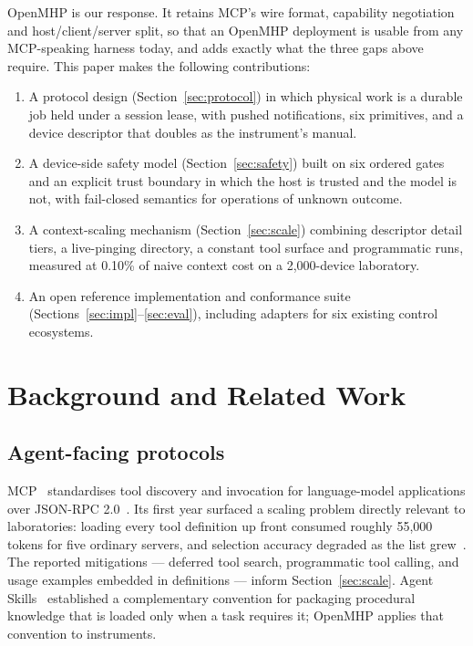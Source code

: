 \documentclass[11pt]{article}
\begin{document}
OpenMHP is our response. It retains MCP's wire format, capability negotiation and
host/client/server split, so that an OpenMHP deployment is usable from any MCP-speaking
harness today, and adds exactly what the three gaps above require. This paper makes the
following contributions:

\begin{enumerate}
  \item A protocol design (Section~\ref{sec:protocol}) in which physical work is a durable
    job held under a session lease, with pushed notifications, six primitives, and a
    device descriptor that doubles as the instrument's manual.
  \item A device-side safety model (Section~\ref{sec:safety}) built on six ordered gates and
    an explicit trust boundary in which the host is trusted and the model is not, with
    fail-closed semantics for operations of unknown outcome.
  \item A context-scaling mechanism (Section~\ref{sec:scale}) combining descriptor detail
    tiers, a live-pinging directory, a constant tool surface and programmatic runs, measured
    at 0.10\% of naive context cost on a 2{,}000-device laboratory.
  \item An open reference implementation and conformance suite
    (Sections~\ref{sec:impl}--\ref{sec:eval}), including adapters for six existing control
    ecosystems.
\end{enumerate}

\section{Background and Related Work}
\label{sec:related}



\subsection{Agent-facing protocols}
MCP~\cite{mcp2024} standardises tool discovery and invocation for language-model
applications over JSON-RPC 2.0~\cite{jsonrpc}. Its first year surfaced a scaling problem
directly relevant to laboratories: loading every tool definition up front consumed roughly
55{,}000 tokens for five ordinary servers, and selection accuracy degraded as the list
grew~\cite{anthropic-advanced-tool-use}. The reported mitigations --- deferred tool search,
programmatic tool calling, and usage examples embedded in definitions --- inform
Section~\ref{sec:scale}. Agent Skills~\cite{agentskills} established a complementary
convention for packaging procedural knowledge that is loaded only when a task requires it;
OpenMHP applies that convention to instruments.
\end{document}
